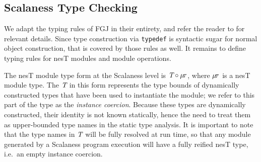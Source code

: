 \subsection{Scalaness Type Checking}
\label{section-typing}

\scalanesstypingfig
We adapt the typing rules of FGJ in their entirety, and refer the reader to \cite{FJ} for
relevant details. Since type construction via \texttt{typedef} is syntactic sugar for normal
object construction, that is covered by those rules as well. It remains to define typing rules
for nesT modules and module operations.


The nesT module type form at the Scalaness level is $\textit{T} \circ \mu\!\tau$, where
$\mu\!\tau$ is a nesT module type. The $\textit{T}$ in this form represents the type bounds of
dynamically constructed types that have been used to instantiate the module; we refer to this
part of the type as the \emph{instance coercion}. Because these types are dynamically
constructed, their identity is not known statically, hence the need to treat them as
upper-bounded type names in the static type analysis. It is important to note that the type
names in $\textit{T}$ will be fully resolved at run time, so that any module generated by a
Scalaness program execution will have a fully reified nesT type, i.e.~an empty instance
coercion.

